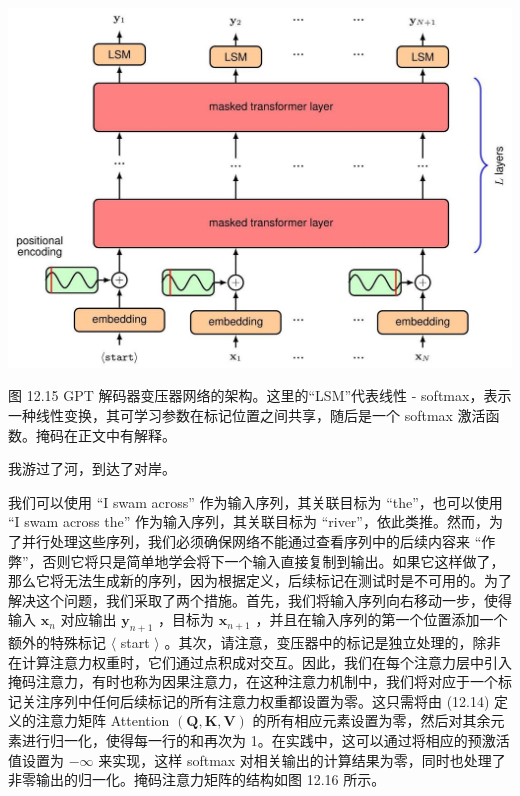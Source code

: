 \documentclass[10pt]{report}
\begin{document}
\begin{center}
\includegraphics[max width=1.0\textwidth]{images/0194e279-9b28-703a-88f4-c3ac21e2010d_403_297_353_1240_886_0.jpg}
\end{center}
\hspace*{3em} 

图 12.15 GPT 解码器变压器网络的架构。这里的“LSM”代表线性 - softmax，表示一种线性变换，其可学习参数在标记位置之间共享，随后是一个 softmax 激活函数。掩码在正文中有解释。

我游过了河，到达了对岸。

我们可以使用 “I swam across” 作为输入序列，其关联目标为 “the”，也可以使用 “I swam across the” 作为输入序列，其关联目标为 “river”，依此类推。然而，为了并行处理这些序列，我们必须确保网络不能通过查看序列中的后续内容来 “作弊”，否则它将只是简单地学会将下一个输入直接复制到输出。如果它这样做了，那么它将无法生成新的序列，因为根据定义，后续标记在测试时是不可用的。为了解决这个问题，我们采取了两个措施。首先，我们将输入序列向右移动一步，使得输入 \({\mathbf{x}}_{n}\) 对应输出 \({\mathbf{y}}_{n + 1}\) ，目标为 \({\mathbf{x}}_{n + 1}\) ，并且在输入序列的第一个位置添加一个额外的特殊标记 \(\langle\) start \(\rangle\) 。其次，请注意，变压器中的标记是独立处理的，除非在计算注意力权重时，它们通过点积成对交互。因此，我们在每个注意力层中引入掩码注意力，有时也称为因果注意力，在这种注意力机制中，我们将对应于一个标记关注序列中任何后续标记的所有注意力权重都设置为零。这只需将由 (12.14) 定义的注意力矩阵 Attention \(\left( {\mathbf{Q},\mathbf{K},\mathbf{V}}\right)\) 的所有相应元素设置为零，然后对其余元素进行归一化，使得每一行的和再次为 1。在实践中，这可以通过将相应的预激活值设置为 \(- \infty\) 来实现，这样 softmax 对相关输出的计算结果为零，同时也处理了非零输出的归一化。掩码注意力矩阵的结构如图 12.16 所示。
\end{document}
